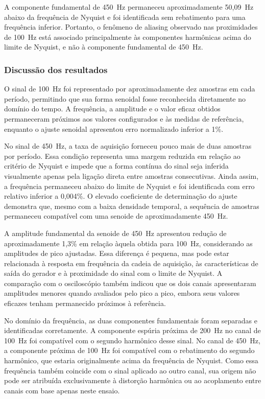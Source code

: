 \documentclass[a4paper,12pt]{fcte}
\begin{document}
A componente fundamental de 450~Hz permaneceu aproximadamente 50,09~Hz abaixo da frequência de Nyquist e foi identificada sem rebatimento para uma frequência inferior. Portanto, o fenômeno de aliasing observado nas proximidades de 100~Hz está associado principalmente às componentes harmônicas acima do limite de Nyquist, e não à componente fundamental de 450~Hz.

\subsubsection{Discussão dos resultados}
\label{subsubsec:discussao_senoides_altas}

O sinal de 100~Hz foi representado por aproximadamente dez amostras em cada período, permitindo que sua forma senoidal fosse reconhecida diretamente no domínio do tempo. A frequência, a amplitude e o valor eficaz obtidos permaneceram próximos aos valores configurados e às medidas de referência, enquanto o ajuste senoidal apresentou erro normalizado inferior a 1\%.

No sinal de 450~Hz, a taxa de aquisição forneceu pouco mais de duas amostras por período. Essa condição representa uma margem reduzida em relação ao critério de Nyquist e impede que a forma contínua do sinal seja inferida visualmente apenas pela ligação direta entre amostras consecutivas. Ainda assim, a frequência permaneceu abaixo do limite de Nyquist e foi identificada com erro relativo inferior a 0,004\%. O elevado coeficiente de determinação do ajuste demonstra que, mesmo com a baixa densidade temporal, a sequência de amostras permaneceu compatível com uma senoide de aproximadamente 450~Hz.

A amplitude fundamental da senoide de 450~Hz apresentou redução de aproximadamente 1,3\% em relação àquela obtida para 100~Hz, considerando as amplitudes de pico ajustadas. Essa diferença é pequena, mas pode estar relacionada à resposta em frequência da cadeia de aquisição, às características de saída do gerador e à proximidade do sinal com o limite de Nyquist. A comparação com o osciloscópio também indicou que os dois canais apresentaram amplitudes menores quando avaliados pelo pico a pico, embora seus valores eficazes tenham permanecido próximos à referência.

No domínio da frequência, as duas componentes fundamentais foram separadas e identificadas corretamente. A componente espúria próxima de 200~Hz no canal de 100~Hz foi compatível com o segundo harmônico desse sinal. No canal de 450~Hz, a componente próxima de 100~Hz foi compatível com o rebatimento do segundo harmônico, que estaria originalmente acima da frequência de Nyquist. Como essa frequência também coincide com o sinal aplicado ao outro canal, sua origem não pode ser atribuída exclusivamente à distorção harmônica ou ao acoplamento entre canais com base apenas neste ensaio.
\end{document}
